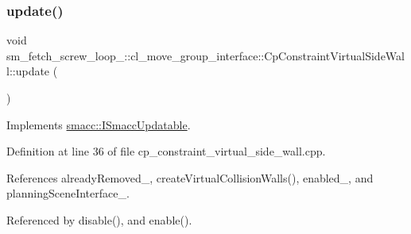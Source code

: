 \subsubsection{\texorpdfstring{update()}{update()}}
{\footnotesize\ttfamily void sm\+\_\+fetch\+\_\+screw\+\_\+loop\+\_\+::cl\+\_\+move\+\_\+group\+\_\+interface\+::\+Cp\+Constraint\+Virtual\+Side\+Wall\+::update (\begin{DoxyParamCaption}{ }\end{DoxyParamCaption})\hspace{0.3cm}{\ttfamily [virtual]}}



Implements \hyperlink{classsmacc_1_1ISmaccUpdatable_a84ee0520cbefdb1d412bed54650b028e}{smacc\+::\+I\+Smacc\+Updatable}.



Definition at line 36 of file cp\+\_\+constraint\+\_\+virtual\+\_\+side\+\_\+wall.\+cpp.



References already\+Removed\+\_\+, create\+Virtual\+Collision\+Walls(), enabled\+\_\+, and planning\+Scene\+Interface\+\_\+.



Referenced by disable(), and enable().


